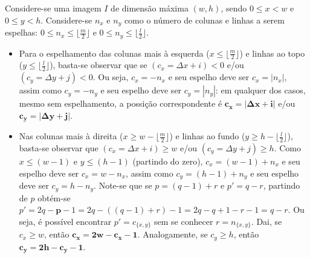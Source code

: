 Considere-se uma imagem $I$ de dimensão máxima $(w, h)$, 
sendo $0 \le x < w$ e $0 \le y < h$.
Considere-se $n_x$ e $n_y$ como o número de colunas e linhas a serem espelhas:
$0 \le n_x \le \lfloor\frac{m}{2}\rfloor$ e 
$0 \le n_y \le \lfloor\frac{l}{2}\rfloor$.


\begin{itemize}
\item 
Para o espelhamento das colunas mais à esquerda 
($x \le \lfloor\frac{m}{2}\rfloor$) e linhas ao topo 
($y \le \lfloor\frac{l}{2}\rfloor$), 
basta-se observar que se 
$(c_x = \Delta{x} + i) < 0 $ e/ou 
$(c_y = \Delta{y} + j) < 0$.
Ou seja,
$c_x = -n_x$ e seu espelho deve ser $c_x = |n_x|$, assim como
$c_y = -n_y$ e seu espelho deve ser $c_y = |n_y|$:
em qualquer dos casos, mesmo sem espelhamento, a possição correspondente é 
$\mathbf{c_x = |\Delta{x} + i|}$ e/ou
$\mathbf{c_y = |\Delta{y} + j|}$.

\item
Nas colunas mais à direita 
($x \ge w - \lfloor\frac{m}{2}\rfloor$) e linhas ao fundo 
($y \ge h - \lfloor\frac{l}{2}\rfloor$), 
basta-se observar que 
$(c_x = \Delta{x} + i) \ge w$ e/ou 
$(c_y = \Delta{y} + j) \ge h$.
Como $x \le (w - 1)$ e $y \le (h - 1)$ (partindo do zero),
$c_x = (w - 1) + n_x$ e seu espelho deve ser $c_x = w - n_x$, assim como
$c_y = (h - 1) + n_y$ e seu espelho deve ser $c_y = h - n_y$.
Note-se que se $p = (q - 1) + r$ e $p' = q - r$, 
partindo de $p$ obtém-se 
$p' = 2q - \mathbf{p} - 1 = 2q - ((q - 1) + r) - 1 = 2q - q + 1 - r - 1 = q - r$.
Ou seja, é possível encontrar $p' = c_{\{x,y\}}$ 
sem se conhecer $r = n_{\{x,y\}}$.
Dai, se $c_x \ge w$, então $\mathbf{c_x = 2w - c_x - 1}$.
Analogamente, se $c_y \ge h$, então $\mathbf{c_y = 2h - c_y - 1}$.

\end{itemize}


